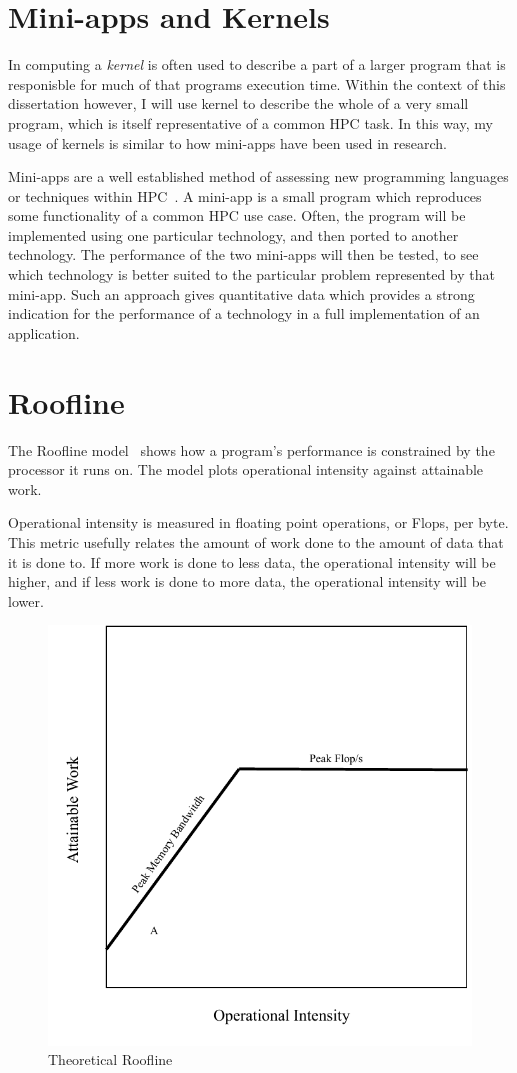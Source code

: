 \section{Mini-apps and Kernels}
In computing a {\em kernel} is often used to describe a part of a larger program that is responisble for much of that programs execution time. Within the context of this dissertation however, I will use kernel to describe the whole of a very small program, which is itself representative of a common HPC task. In this way, my usage of kernels is similar to how mini-apps have been used in research.

Mini-apps are a well established method of assessing new programming languages or techniques within HPC~\cite{Mallinson:2014, Slaughter:2015, martineau2017arch}. A mini-app is a small program which reproduces some functionality of a common HPC use case. Often, the program will be implemented using one particular technology, and then ported to another technology. The performance of the two mini-apps will then be tested, to see which technology is better suited to the particular problem represented by that mini-app. Such an approach gives quantitative data which provides a strong indication for the performance of a technology in a full implementation of an application. 
\section{Roofline}
The Roofline model~\cite{williams2009roofline} shows how a program's performance is constrained by the processor it runs on. The model plots operational intensity against attainable work. 

Operational intensity is measured in floating point operations, or Flops, per byte.
This metric usefully relates the amount of work done to the amount of data that it is done to. If more work is done to less data, the operational intensity will be higher, and if less work is done to more data, the operational intensity will be lower.


\begin{figure}[h]
\centering
\includegraphics[width=.66\linewidth]{figs/roofline.pdf}
\caption{Theoretical Roofline}\label{fig:roof-eg}
\end{figure}

